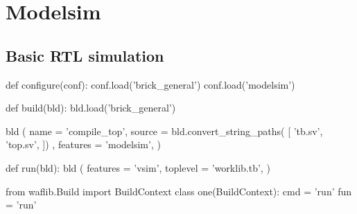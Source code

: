 \section{Modelsim}
\subsection{Basic RTL simulation}

\begin{lstwscript}
def configure(conf):
    conf.load('brick_general')
    conf.load('modelsim')

def build(bld):
    bld.load('brick_general')

    bld (
        name = 'compile_top',
        source = bld.convert_string_paths(
            [   
                'tb.sv',
                'top.sv',
            ])  
            ,   
        features = 'modelsim',
    )   


def run(bld):
    bld (
        features = 'vsim',
        toplevel = 'worklib.tb',
    )   

from waflib.Build import BuildContext
class one(BuildContext):
    cmd = 'run'
    fun = 'run'
\end{lstwscript}


